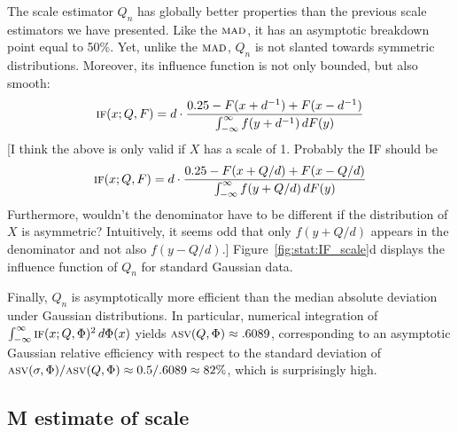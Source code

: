 The scale estimator $Q_n$ has globally better properties than the previous
scale estimators we have presented. Like the $\stsc{MAD}$, it has an asymptotic
breakdown point equal to 50\%. Yet, unlike the $\stsc{MAD}$, $Q_n$ is not
slanted towards symmetric distributions. Moreover, its influence function is
not only bounded, but also smooth:                                              
\[
    \stsc{IF}(x; Q, F) = d\cdot \frac{0.25 - F(x+d^{-1}) + F(x-d^{-1})}{\int_{-\infty}^\infty f(y+d^{-1}) \dif F(y)}
\]
\alert{[I think the above is only valid if $X$ has a scale of 1. Probably the IF should be
\[
    \stsc{IF}(x; Q, F) = d\cdot \frac{0.25 - F(x+Q/d) + F(x-Q/d)}{\int_{-\infty}^\infty f(y+Q/d) \dif F(y)}
\]
Furthermore, wouldn't the denominator have to be different if the distribution 
of $X$ is asymmetric? Intuitively, it seems odd that only $f(y+Q/d)$ appears in 
the denominator and not also $f(y-Q/d)$.]
}
Figure~\ref{fig:stat:IF_scale}d displays the influence function of $Q_n$ for 
standard Gaussian data.                                                         

Finally, $Q_n$ is asymptotically more efficient than the median absolute
deviation under Gaussian distributions. In particular, numerical integration of
$\int_{-\infty}^\infty \stsc{IF}(x;Q,\Phi)^2 \dif \Phi(x)$ yields
$\stsc{ASV}(Q,\Phi) \approx .6089$, corresponding to an asymptotic Gaussian        
relative efficiency with respect to the standard deviation of
$\stsc{ASV}(\sigma, \Phi) / \stsc{ASV}(Q, \Phi) \approx 0.5/.6089 \approx 82\%$,
which is surprisingly high.

\begin{stlog}

\end{stlog}

\subsection{M estimate of scale}

